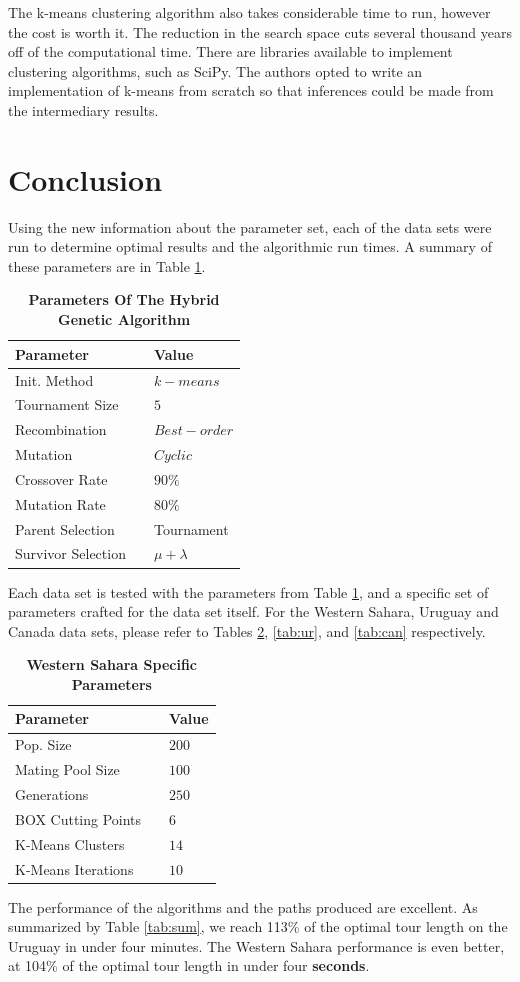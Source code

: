 \documentclass[12pt,twocolumn,oneside]{osajnl}
\begin{document}
The k-means clustering algorithm also takes considerable time to run, however the cost is worth it. The reduction in the search space cuts several thousand years off of the computational time. There are libraries available to implement clustering algorithms, such as SciPy. The authors opted to write an implementation of k-means from scratch so that inferences could be made from the intermediary results.

\section{Conclusion}
Using the new information about the parameter set, each of the data sets were run to determine optimal results and the algorithmic run times. A summary of these parameters are in Table \ref{tab:parameters2}. 

\begin{table}[htbp]
\centering
\caption{\bf Parameters Of The Hybrid Genetic Algorithm}
\begin{tabular}{lll}
\hline
Parameter && Value \\
\hline
Init. Method && $k-means$ \\
Tournament Size && $5$ \\
Recombination && $Best-order$ \\
Mutation && $Cyclic$ \\
Crossover Rate && $90\%$ \\
Mutation Rate && $80\%$ \\
Parent Selection && Tournament \\
Survivor Selection && $\mu + \lambda$ \\
\hline
\end{tabular}
  \label{tab:parameters2}
\end{table}

Each data set is tested with the parameters from Table \ref{tab:parameters2}, and a specific set of parameters crafted for the data set itself. For the Western Sahara, Uruguay and Canada data sets, please refer to Tables \ref{tab:wh}, \ref{tab:ur}, and \ref{tab:can} respectively.

\begin{table}[htbp]
\centering
\caption{\bf Western Sahara Specific Parameters}
\begin{tabular}{lll}
\hline
Parameter && Value \\
\hline
Pop. Size && $200$ \\
Mating Pool Size && $100$ \\
Generations && $250$ \\
BOX Cutting Points && $6$ \\
K-Means Clusters && $14$ \\
K-Means Iterations && $10$ \\
\hline
\end{tabular}
  \label{tab:wh}
\end{table}
The performance of the algorithms and the paths produced are excellent. As summarized by Table \ref{tab:sum}, we reach 113\% of the optimal tour length on the Uruguay in under four minutes. The Western Sahara performance is even better, at 104\% of the optimal tour length in under four \textbf{seconds}. 
\end{document}
